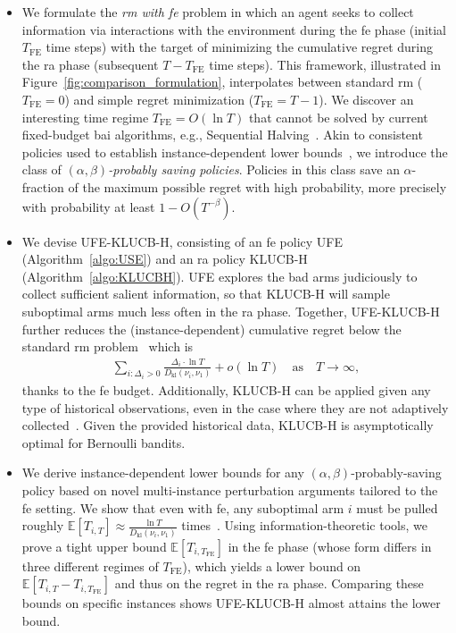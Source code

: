 \documentclass[twoside,11pt]{article}
\newcommand{\kl}{D_{\mathrm{kl}}}
\newcommand{\bbE}{\mathbb{E}}
\newcommand{\Tfe}{T_{\mathrm{FE}}}
\newcommand{\ouralg}{\textsc{UFE-KLUCB-H}}
\newcommand{\ouralgfe}{\textsc{UFE}}
\newcommand{\klucbh}{\textsc{KLUCB-H}}
\begin{document}
\begin{itemize}[leftmargin=*] 
\item  We formulate the \emph{\ac{rm} with \ac{fe}} problem in which 
an agent seeks to collect information via interactions with the environment during the \ac{fe} phase (initial $\Tfe$ time steps) with the target of minimizing the cumulative regret during the \ac{ra} phase (subsequent $T-\Tfe$ time steps).
This framework, illustrated in Figure~\ref{fig:comparison_formulation}, interpolates between standard \ac{rm} ($\Tfe = 0 $) and simple regret minimization ($\Tfe =T-1$). We discover an interesting time regime $\Tfe = O(\ln T)$ that cannot be solved by current fixed-budget \ac{bai} algorithms, e.g., Sequential Halving~\citep{karnin2013optimal}.
Akin to consistent policies used to establish instance-dependent lower bounds~\citep{lattimore2020bandit}, we  introduce the class of {\em $(\alpha,\beta)$-probably saving policies}. Policies in this class   save an $\alpha$-fraction of the maximum possible regret with high probability, more precisely with probability at least $1-O(T^{-\beta})$.

\item 
We devise \ouralg{}, consisting of an \ac{fe} policy \ouralgfe{} (Algorithm~\ref{algo:USE}) and an \ac{ra} policy \klucbh{} (Algorithm~\ref{algo:KLUCBH}). \ouralgfe{} explores the bad arms judiciously to collect sufficient salient information, so that \klucbh{} will sample   suboptimal arms much less often in the \ac{ra} phase. Together, \ouralg{} further reduces  the (instance-dependent) cumulative regret below the standard \ac{rm} problem~\citep{lai1985asymptotically,lattimore2020bandit} which is 
\begin{align}\label{equ:reg_lowbd}
        \sum_{i:\Delta_{i}>0} \frac{\Delta_i\cdot\ln T}{\kl(\nu_i,\nu_1)} +o(\ln T)\quad\mbox{as}\quad T\to\infty,
\end{align}
thanks to the \ac{fe} budget. 
Additionally, \klucbh{} can be applied given any type of historical observations, even in the case where they are not adaptively collected~\citep{shivaswamy2012multi}.
Given the provided historical data, \klucbh{} is asymptotically optimal for Bernoulli bandits.

\item 
We derive  instance-dependent lower bounds for any  $(\alpha,\beta)$-probably-saving policy based on novel multi-instance perturbation arguments tailored to the \ac{fe} setting.  
We show that even with \ac{fe}, any suboptimal arm $i$ must be pulled roughly $\bbE[T_{i,T}]\approx\frac{\ln T}{\kl(\nu_i,\nu_1)}$ times~\citep{lattimore2020bandit}. Using information-theoretic tools, we prove a tight upper bound  $\bbE[T_{i,\Tfe}]$ in the \ac{fe} phase (whose form differs in  three different regimes of $\Tfe$), which yields a lower bound on $\bbE[T_{i,T}-T_{i,\Tfe}]$ and thus on the regret in the \ac{ra} phase. Comparing these bounds on specific instances shows \ouralg{} almost attains the lower bound.


\end{itemize}
\end{document}
